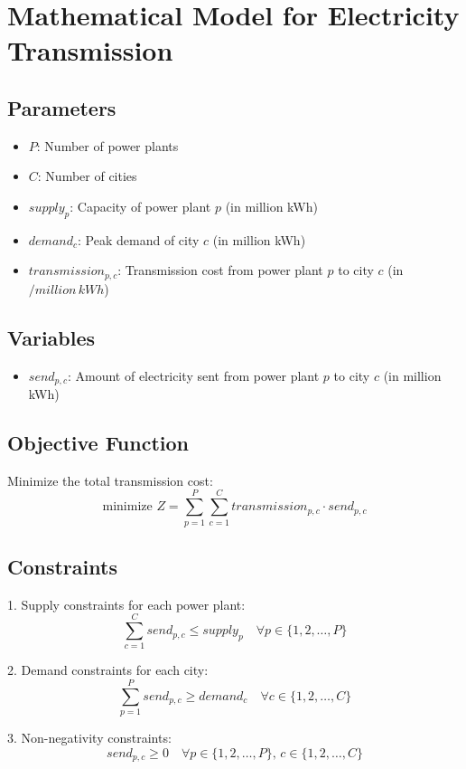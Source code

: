 \documentclass{article}
\begin{document}
\section*{Mathematical Model for Electricity Transmission}

\subsection*{Parameters}
\begin{itemize}
    \item $P$: Number of power plants
    \item $C$: Number of cities
    \item $supply_p$: Capacity of power plant $p$ (in million kWh)
    \item $demand_c$: Peak demand of city $c$ (in million kWh)
    \item $transmission_{p,c}$: Transmission cost from power plant $p$ to city $c$ (in $/million \, kWh$)
\end{itemize}

\subsection*{Variables}
\begin{itemize}
    \item $send_{p,c}$: Amount of electricity sent from power plant $p$ to city $c$ (in million kWh)
\end{itemize}

\subsection*{Objective Function}
Minimize the total transmission cost:
\[
\text{minimize } Z = \sum_{p=1}^{P} \sum_{c=1}^{C} transmission_{p,c} \cdot send_{p,c}
\]

\subsection*{Constraints}
1. Supply constraints for each power plant:
\[
\sum_{c=1}^{C} send_{p,c} \leq supply_p \quad \forall p \in \{1, 2, \ldots, P\}
\]

2. Demand constraints for each city:
\[
\sum_{p=1}^{P} send_{p,c} \geq demand_c \quad \forall c \in \{1, 2, \ldots, C\}
\]

3. Non-negativity constraints:
\[
send_{p,c} \geq 0 \quad \forall p \in \{1, 2, \ldots, P\}, \, c \in \{1, 2, \ldots, C\}
\]
\end{document}

